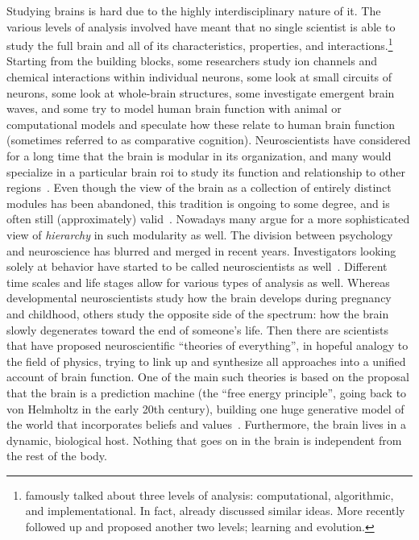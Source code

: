 Studying brains is hard due to the highly interdisciplinary nature of it.
The various levels of analysis involved have meant that no single scientist is able to study the full brain and all of its characteristics, properties, and interactions.\footnote{\textcite{Marr1982} famously talked about three levels of analysis: computational, algorithmic, and implementational. In fact, \textcite{Marr1976} already discussed similar ideas. More recently \textcite{Poggio2012} followed up and proposed another two levels; learning and evolution.}
Starting from the building blocks, some researchers study ion channels and chemical interactions within individual neurons, some look at small circuits of neurons, some look at whole-brain structures, some investigate emergent brain waves, and some try to model human brain function with animal or computational models and speculate how these relate to human brain function (sometimes referred to as comparative cognition).
Neuroscientists have considered for a long time that the brain is modular in its organization, and many would specialize in a particular brain \gls{roi} to study its function and relationship to other regions~\parencite{Prinz2006}.
Even though the view of the brain as a collection of entirely distinct modules has been abandoned, this tradition is ongoing to some degree, and is often still (approximately) valid~\parencite{Genon2018}.
Nowadays many argue for a more sophisticated view of \emph{hierarchy} in such modularity as well.
%
The division between psychology and neuroscience has blurred and merged in recent years.
Investigators looking solely at behavior have started to be called neuroscientists as well~\parencite{Niv2021}.
%
Different time scales and life stages allow for various types of analysis as well.
Whereas developmental neuroscientists study how the brain develops during pregnancy and childhood, others study the opposite side of the spectrum: how the brain slowly degenerates toward the end of someone's life.
%
Then there are scientists that have proposed neuroscientific ``theories of everything'', in hopeful analogy to the field of physics, trying to link up and synthesize all approaches into a unified account of brain function.
One of the main such theories is based on the proposal that the brain is a prediction machine (the ``free energy principle'', going back to von Helmholtz in the early 20th century), building one huge generative model of the world that incorporates beliefs and values~\parencite{Friston2010, Gershman2019}.
%
Furthermore, the brain lives in a dynamic, biological host.
Nothing that goes on in the brain is independent from the rest of the body.
